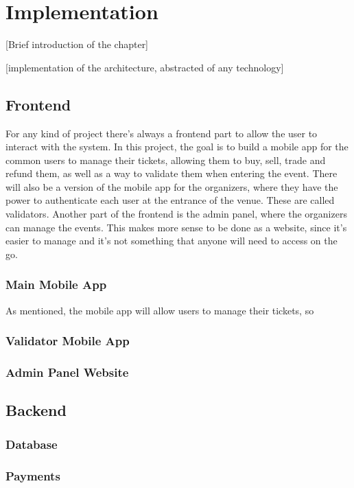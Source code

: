 \chapter{Implementation}
 [Brief introduction of the chapter]

 [implementation of the architecture, abstracted of any technology]

\section{Frontend}
For any kind of project there's always a frontend part to allow the user to interact with the system. In this project, the goal is to build a mobile app for the common users to manage their tickets, allowing them to buy, sell, trade and refund them, as well as a way to validate them when entering the event.
There will also be a version of the mobile app for the organizers, where they have the power to authenticate each user at the entrance of the venue. These are called validators.
Another part of the frontend is the admin panel, where the organizers can manage the events. This makes more sense to be done as a website, since it's easier to manage and it's not something that anyone will need to access on the go.

\subsection{Main Mobile App}
As mentioned, the mobile app will allow users to manage their tickets, so

\subsection{Validator Mobile App}

\subsection{Admin Panel Website}


\section{Backend}

\subsection{Database}

\subsection{Payments}